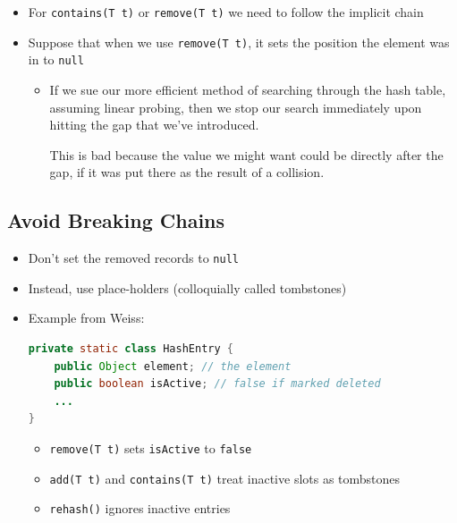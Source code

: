 \documentclass[
  10pt,
  english,
  letterpaper,
,tablecaptionabove
]{scrartcl}
\newcommand{\passthrough}[1]{#1}
\providecommand{\tightlist}{%
  \setlength{\itemsep}{0pt}\setlength{\parskip}{0pt}}
\begin{document}
\begin{itemize}
\tightlist
\item
  For \passthrough{\lstinline!contains(T t)!} or
  \passthrough{\lstinline!remove(T t)!} we need to follow the implicit
  chain
\item
  Suppose that when we use \passthrough{\lstinline!remove(T t)!}, it
  sets the position the element was in to \passthrough{\lstinline!null!}

  \begin{itemize}
  \item
    If we sue our more efficient method of searching through the hash
    table, assuming linear probing, then we stop our search immediately
    upon hitting the gap that we've introduced.

    This is bad because the value we might want could be directly after
    the gap, if it was put there as the result of a collision.
  \end{itemize}
\end{itemize}

\hypertarget{avoid-breaking-chains}{%
\subsection{Avoid Breaking Chains}\label{avoid-breaking-chains}}

\begin{itemize}
\item
  Don't set the removed records to \passthrough{\lstinline!null!}
\item
  Instead, use place-holders (colloquially called tombstones)
\item
  Example from Weiss:

\begin{lstlisting}[language=Java]
private static class HashEntry {
    public Object element; // the element
    public boolean isActive; // false if marked deleted
    ...
}
\end{lstlisting}

  \begin{itemize}
  \tightlist
  \item
    \passthrough{\lstinline!remove(T t)!} sets
    \passthrough{\lstinline!isActive!} to
    \passthrough{\lstinline!false!}
  \item
    \passthrough{\lstinline!add(T t)!} and
    \passthrough{\lstinline!contains(T t)!} treat inactive slots as
    tombstones
  \item
    \passthrough{\lstinline!rehash()!} ignores inactive entries
  \end{itemize}
\end{itemize}
\end{document}
